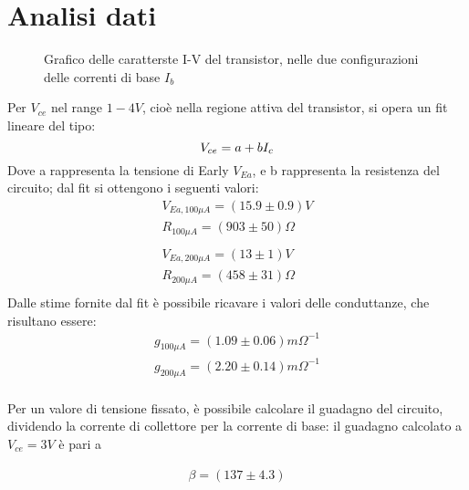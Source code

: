 \documentclass{article}
\begin{document}
\section{Analisi dati}
\begin{figure}[H]
    \centering
    \scalebox{0.7}{}
    \caption{\label{fig:multigraph}Grafico delle caratterste I-V del transistor, nelle due configurazioni delle correnti di base $I_b$}
\end{figure}
Per $V_{ce}$ nel range $1-4 V$, cioè nella regione attiva del transistor, si opera un fit lineare del tipo:
\begin{equation}
    V_{ce} = a + b I_c\\
\end{equation}
Dove a rappresenta la tensione di Early $V_{Ea}$, e b rappresenta la resistenza del circuito; dal fit si ottengono i seguenti valori:
\begin{equation}
    \begin{aligned}
        V_{Ea,100\mu A}=(15.9\pm 0.9) V      \\
        R_{100\mu A}=(903 \pm 50) \Omega \\
        \\
        V_{Ea,200\mu A}=(13\pm 1) V      \\
        R_{200\mu A}=(458 \pm 31) \Omega \\
    \end{aligned}
\end{equation}
Dalle stime fornite dal fit è possibile ricavare i valori delle conduttanze, che risultano essere:
\begin{equation}
    \begin{aligned}
        g_{100 \mu A}=(1.09 \pm 0.06) m\Omega^{-1} \\
        g_{200 \mu A}=(2.20 \pm 0.14) m\Omega^{-1} \\
    \end{aligned}
\end{equation}

Per un valore di tensione fissato, è possibile calcolare il guadagno del circuito, dividendo la corrente di collettore per la corrente di base: il guadagno calcolato a $V_{ce}=3 V$ è pari a

\begin{equation}
    \begin{aligned}
        \beta=(137\pm4.3)
    \end{aligned}
\end{equation}
\end{document}
